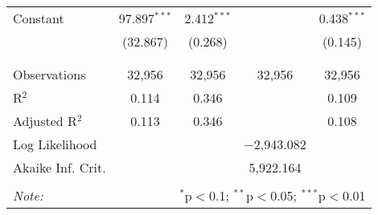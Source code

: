 \documentclass[]{article}
\begin{document}
\begin{table}[!htbp]
\begin{tabular}{@{\extracolsep{5pt}}lcccc}
 Constant & 97.897$^{***}$ & 2.412$^{***}$ &  & 0.438$^{***}$ \\ 
  & (32.867) & (0.268) & & (0.145) \\ 
  & & & & \\ 
\hline \\[-1.8ex] 
Observations & 32,956 & 32,956 & 32,956 & 32,956 \\ 
R$^{2}$ & 0.114 & 0.346 &  & 0.109 \\ 
Adjusted R$^{2}$ & 0.113 & 0.346 &  & 0.108 \\ 
Log Likelihood &  &  & $-$2,943.082 &  \\ 
Akaike Inf. Crit. &  &  & 5,922.164 &  \\ 
\hline 
\hline \\[-1.8ex] 
\textit{Note:}  & \multicolumn{4}{r}{$^{*}$p$<$0.1; $^{**}$p$<$0.05; $^{***}$p$<$0.01} \\ 
\end{tabular} 
\end{table}

\clearpage
\scriptsize
\end{document}
